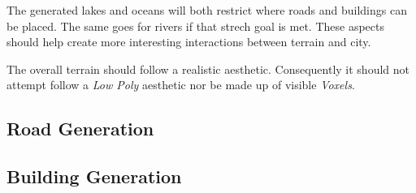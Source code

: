 The generated lakes and oceans will both restrict where roads and buildings can be placed.
The same goes for rivers if that strech goal is met.
These aspects should help create more interesting interactions between terrain and city.

The overall terrain should follow a realistic aesthetic. Consequently it should not
attempt follow a \textit{Low Poly} aesthetic nor be made up of visible \textit{Voxels}.

\subsection{Road Generation}
\subsection{Building Generation}
